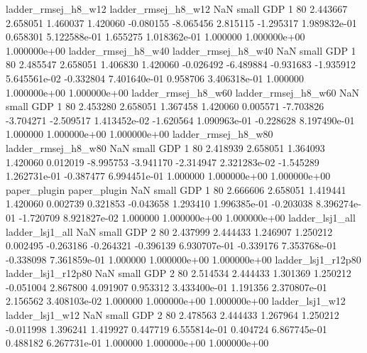      ladder_rmsej_h8_w12      ladder_rmsej_h8_w12                   NaN      small      GDP                 1 80 2.443667       2.658051 1.460037       1.420060   -0.080155     -8.065456      2.815115    -1.295317   1.989832e-01  0.658301 5.122588e-01     1.655275   1.018362e-01            1.000000    1.000000e+00        1.000000e+00
     ladder_rmsej_h8_w40      ladder_rmsej_h8_w40                   NaN      small      GDP                 1 80 2.485547       2.658051 1.406830       1.420060   -0.026492     -6.489884     -0.931683    -1.935912   5.645561e-02 -0.332804 7.401640e-01     0.958706   3.406318e-01            1.000000    1.000000e+00        1.000000e+00
     ladder_rmsej_h8_w60      ladder_rmsej_h8_w60                   NaN      small      GDP                 1 80 2.453280       2.658051 1.367458       1.420060    0.005571     -7.703826     -3.704271    -2.509517   1.413452e-02 -1.620564 1.090963e-01    -0.228628   8.197490e-01            1.000000    1.000000e+00        1.000000e+00
     ladder_rmsej_h8_w80      ladder_rmsej_h8_w80                   NaN      small      GDP                 1 80 2.418939       2.658051 1.364093       1.420060    0.012019     -8.995753     -3.941170    -2.314947   2.321283e-02 -1.545289 1.262731e-01    -0.387477   6.994451e-01            1.000000    1.000000e+00        1.000000e+00
            paper_plugin             paper_plugin                   NaN      small      GDP                 1 80 2.666606       2.658051 1.419441       1.420060    0.002739      0.321853     -0.043658     1.293410   1.996385e-01 -0.203038 8.396274e-01    -1.720709   8.921827e-02            1.000000    1.000000e+00        1.000000e+00
         ladder_lsj1_all          ladder_lsj1_all                   NaN      small      GDP                 2 80 2.437999       2.444433 1.246907       1.250212    0.002495     -0.263186     -0.264321    -0.396139   6.930707e-01 -0.339176 7.353768e-01    -0.338098   7.361859e-01            1.000000    1.000000e+00        1.000000e+00
      ladder_lsj1_r12p80       ladder_lsj1_r12p80                   NaN      small      GDP                 2 80 2.514534       2.444433 1.301369       1.250212   -0.051004      2.867800      4.091907     0.953312   3.433400e-01  1.191356 2.370807e-01     2.156562   3.408103e-02            1.000000    1.000000e+00        1.000000e+00
         ladder_lsj1_w12          ladder_lsj1_w12                   NaN      small      GDP                 2 80 2.478563       2.444433 1.267964       1.250212   -0.011998      1.396241      1.419927     0.447719   6.555814e-01  0.404724 6.867745e-01     0.488182   6.267731e-01            1.000000    1.000000e+00        1.000000e+00
